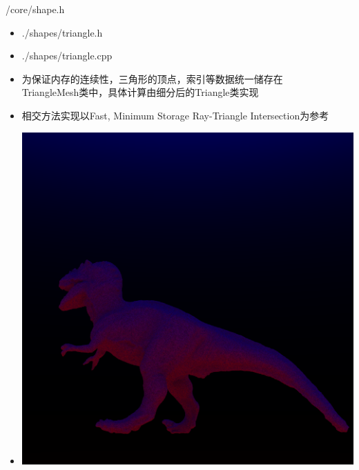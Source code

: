 \documentclass{beamer}
\begin{document}
\begin{frame} {/core/shape.h}
\begin{itemize}
\item ./shapes/triangle.h
\item ./shapes/triangle.cpp
\item 为保证内存的连续性，三角形的顶点，索引等数据统一储存在 \\ TriangleMesh类中，具体计算由细分后的Triangle类实现
\item 相交方法实现以Fast, Minimum Storage Ray-Triangle Intersection为参考
\item \includegraphics[scale=0.25]{tyra}
\end{itemize}
\end{frame}
\end{document}
